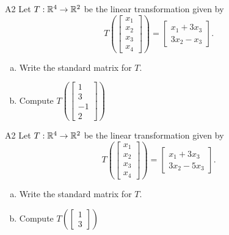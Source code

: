 \begin{problem}{A2}
Let $T: \mathbb{R}^4 \rightarrow \mathbb{R}^2$ be the linear transformation given by $$T\left(\begin{bmatrix} x_1 \\ x_2 \\ x_3 \\ x_4 \end{bmatrix} \right) = \begin{bmatrix} x_1+3x_3 \\ 3x_2-x_3 \end{bmatrix}.$$
\begin{enumerate}[(a)]
\item Write the standard matrix for $T$.
\item Compute \( T\left( \begin{bmatrix} 1 \\ 3 \\ -1 \\ 2 \end{bmatrix} \right) \)
\end{enumerate}
\end{problem}


\begin{problem}{A2}
Let $T: \mathbb{R}^4 \rightarrow \mathbb{R}^2$ be the linear transformation given by $$T\left(\begin{bmatrix} x_1 \\ x_2 \\ x_3 \\ x_4 \end{bmatrix} \right) = \begin{bmatrix} x_1+3x_3 \\ 3x_2-5x_3 \end{bmatrix}.$$
\begin{enumerate}[(a)]
\item Write the standard matrix for $T$.
\item Compute \( T\left( \begin{bmatrix} 1 \\ 3 \end{bmatrix} \right) \)
\end{enumerate}
\end{problem}


